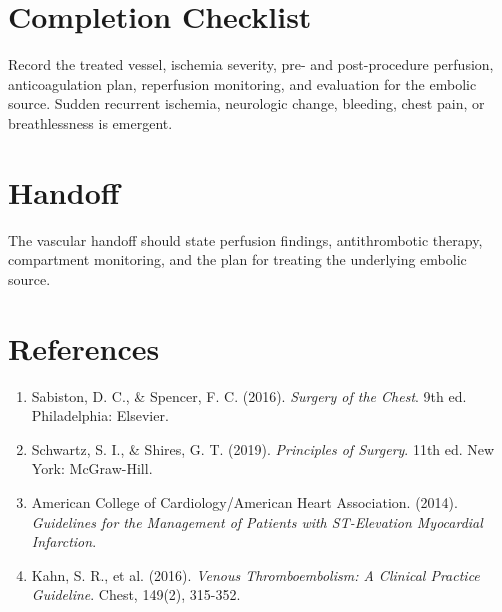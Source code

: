 \section*{Completion Checklist}
Record the treated vessel, ischemia severity, pre- and post-procedure perfusion, anticoagulation plan, reperfusion monitoring, and evaluation for the embolic source. Sudden recurrent ischemia, neurologic change, bleeding, chest pain, or breathlessness is emergent.

\section*{Handoff}
The vascular handoff should state perfusion findings, antithrombotic therapy, compartment monitoring, and the plan for treating the underlying embolic source.

\section*{References}

\begin{enumerate}
    \item Sabiston, D. C., \& Spencer, F. C. (2016). \textit{Surgery of the Chest}. 9th ed. Philadelphia: Elsevier.
    
    \item Schwartz, S. I., \& Shires, G. T. (2019). \textit{Principles of Surgery}. 11th ed. New York: McGraw-Hill.
    
    \item American College of Cardiology/American Heart Association. (2014). \textit{Guidelines for the Management of Patients with ST-Elevation Myocardial Infarction}.
    
    \item Kahn, S. R., et al. (2016). \textit{Venous Thromboembolism: A Clinical Practice Guideline}. Chest, 149(2), 315-352.
\end{enumerate}

\clearpage
